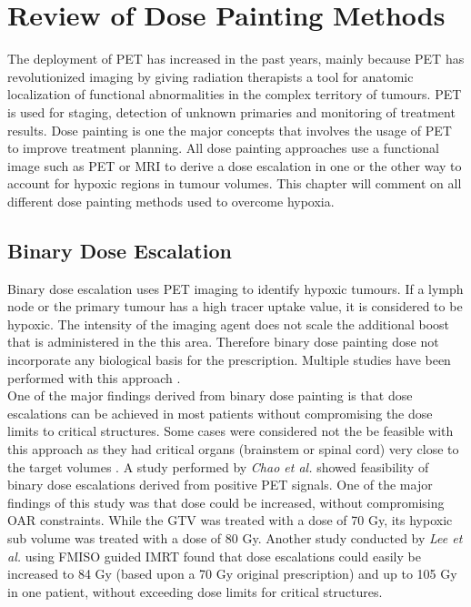 \section{Review of Dose Painting Methods}
The deployment of PET has increased in the past years, mainly because PET has revolutionized imaging by giving radiation therapists a tool for anatomic localization of functional abnormalities in the complex territory of tumours. PET is used for staging, detection of unknown primaries and monitoring of treatment results. Dose painting is one the major concepts that involves the usage of PET to improve treatment planning. All dose painting approaches use a functional image such as PET or MRI to derive a dose escalation in one or the other way to account for hypoxic regions in tumour volumes. This chapter will comment on all different dose painting methods used to overcome hypoxia.
\subsection{Binary Dose Escalation}
Binary dose escalation uses PET imaging to identify hypoxic tumours. If a lymph node or the primary tumour has a high tracer uptake value, it is considered to be hypoxic. The intensity of the imaging agent does not scale the additional boost that is administered in the this area. Therefore binary dose painting dose not incorporate any biological basis for the prescription. Multiple studies have been performed with this approach \cite{pmid20855118, pmid11240261, pmid17869020, pmid19203843}.\\One of the major findings derived from binary dose painting is that dose escalations can be achieved in most patients without compromising the dose limits to critical structures. Some cases were considered not the be feasible with this approach as they had critical organs (brainstem or spinal cord) very close to the target volumes \cite{pmid20855118}. A study performed by \textit{Chao et al.} \cite{pmid11240261} showed feasibility of binary dose escalations derived from positive PET signals. One of the major findings of this study was that dose could be increased, without compromising OAR constraints. While the GTV was treated with a dose of 70 Gy, its hypoxic sub volume was treated with a dose of 80 Gy. Another study conducted by \textit{Lee et al.} \cite{pmid17869020} using FMISO guided IMRT found that dose escalations could easily be increased to 84 Gy (based upon a 70 Gy original prescription) and up to 105 Gy in one patient, without exceeding dose limits for critical structures. 
